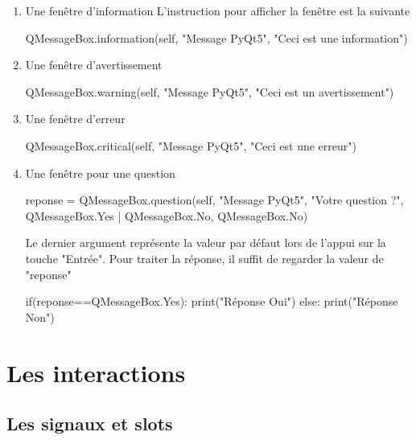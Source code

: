 \begin{enumerate}
    \item Une fenêtre d'information
    L'instruction pour afficher la fenêtre est la suivante
    \begin{pyCode}
    QMessageBox.information(self, "Message PyQt5", "Ceci est une information")
    \end{pyCode}
    \item Une fenêtre d'avertissement
    \begin{pyCode}
    QMessageBox.warning(self, "Message PyQt5", "Ceci est un avertissement")
    \end{pyCode}
    \item Une fenêtre d'erreur
    \begin{pyCode}
    QMessageBox.critical(self, "Message PyQt5", "Ceci est une erreur")
    \end{pyCode}
    \item Une fenêtre pour une question 
    \begin{pyCode}
    reponse = QMessageBox.question(self, "Message PyQt5", "Votre question ?", QMessageBox.Yes | QMessageBox.No, QMessageBox.No)
    \end{pyCode}
    Le dernier argument représente la valeur par défaut lors de l'appui sur la touche "Entrée". \newline
    Pour traiter la réponse, il suffit de regarder la valeur de "reponse"
    \begin{pyCode}
    if(reponse==QMessageBox.Yes):
        print("Réponse Oui")
    else:
        print("Réponse Non")
    \end{pyCode}
\end{enumerate}





\chapter{Les interactions}

\section{Les signaux et slots}

